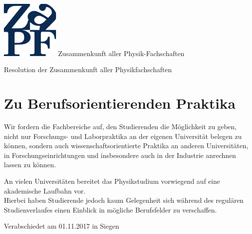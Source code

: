 \documentclass[DIV=calc]{scrartcl}
\begin{document}
    \hspace{0.87\textwidth}
    \begin{minipage}{120pt}
        \vspace{-1.8cm}
        \includegraphics[width=80pt]{../../logo.pdf}
        \centering
        \small Zusammenkunft aller Physik-Fachschaften
    \end{minipage}
    \begin{center}
        \huge{Resolution der Zusammenkunft aller Physikfachschaften}\vspace{.25\baselineskip}\\
        \normalsize
    \end{center}
    \vspace{1cm}
\section*{Zu Berufsorientierenden Praktika}
Wir fordern die Fachbereiche  auf, den Studierenden die Möglichkeit zu geben, nicht nur
Forschungs- und Laborpraktika an der eigenen Universität belegen zu können, sondern auch wissenschaftsorientierte
Praktika an anderen Universitäten, in Forschungseinrichtungen und insbesondere auch in der
Industrie anrechnen lassen zu können.

An vielen Universitäten bereitet das Physikstudium vorwiegend auf eine akademische Laufbahn vor.\\
Hierbei haben Studierende jedoch kaum Gelegenheit sich während des regulären Studienverlaufes einen Einblick in mögliche Berufsfelder zu verschaffen.

\vspace{-0.5\baselineskip}
    \begin{flushright}
        Verabschiedet am 01.11.2017 in Siegen
    \end{flushright}
\end{document}
